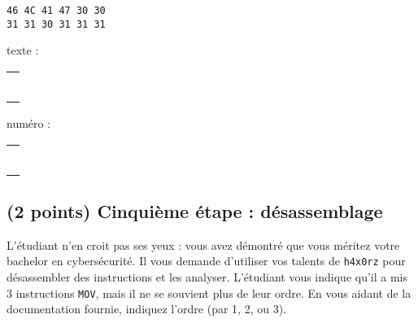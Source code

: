 \documentclass[11pt,a4paper]{article}
\begin{document}
\begin{table}[ht!]
  \centering
  \begin{minipage}{0.3\textwidth}
    \centering

\begin{lstlisting}[style=algorithmique]
46 4C 41 47 30 30
31 31 30 31 31 31
\end{lstlisting}

  \end{minipage}
  \hfillx
  \begin{minipage}{0.3\textwidth}
    \centering

texte :

\medskip

\begin{tabular}{ | m{2.5cm} | }
\hline
 \\ \\ \\ \\ \\ \\
\hline
\end{tabular}

  \end{minipage}
  \hfillx
  \begin{minipage}{0.3\textwidth}
    \centering

numéro :

\medskip

\begin{tabular}{ | m{2.5cm} | }
\hline
 \\ \\ \\ \\ \\ \\
\hline
\end{tabular}

  \end{minipage}
\end{table}


\subsection{(2 points) Cinquième étape : désassemblage }

L'étudiant n'en croit pas ses yeux : vous avez démontré que vous méritez votre bachelor en cybersécurité.
Il vous demande d'utiliser vos talents de \texttt{h4x0rz} pour désassembler des instructions et les analyser.
L'étudiant vous indique qu'il a mis 3 instructions \texttt{MOV}, mais il ne se souvient plus de leur ordre.
En vous aidant de la documentation fournie, indiquez l'ordre (par 1, 2, ou 3).
\end{document}
